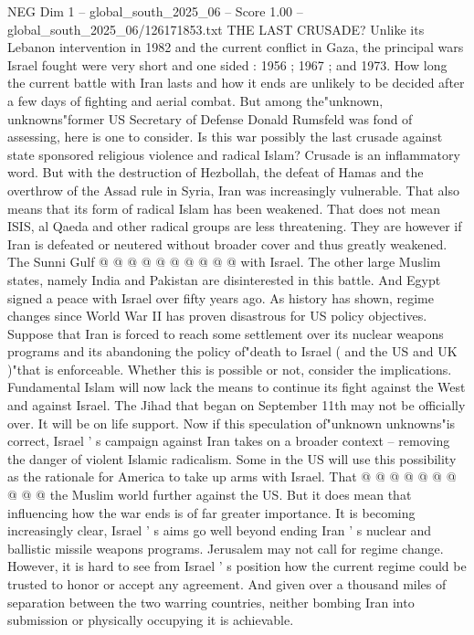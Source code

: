 \begin{textsample}{NEG Dim 1 – global\_south\_2025\_06 – Score 1.00 – global\_south\_2025\_06/126171853.txt}  \label{ex:f1_neg_314}
THE LAST CRUSADE?
Unlike its Lebanon intervention in 1982 and the current conflict in Gaza, the principal wars Israel fought were very short and one sided : 1956 ; 1967 ; and 1973.
How long the current battle with Iran lasts and how it ends are unlikely to be decided after a few days of fighting and aerial combat.
But among the"unknown, unknowns"former US Secretary of Defense Donald Rumsfeld was fond of assessing, here is one to consider.
Is this war possibly the last crusade against state sponsored religious violence and radical Islam?
Crusade is an inflammatory word.
But with the destruction of Hezbollah, the defeat of Hamas and the overthrow of the Assad rule in Syria, Iran was increasingly vulnerable.
That also means that its form of radical Islam has been weakened.
That does not mean ISIS, al Qaeda and other radical groups are less threatening.
They are however if Iran is defeated or neutered without broader cover and thus greatly weakened.
The Sunni Gulf @ @ @ @ @ @ @ @ @ @ with Israel.
The other large Muslim states, namely India and Pakistan are disinterested in this battle.
And Egypt signed a peace with Israel over fifty years ago.
As history has shown, regime changes since World War II has proven disastrous for US policy objectives.
Suppose that Iran is forced to reach some settlement over its nuclear weapons programs and its abandoning the policy of"death to Israel ( and the US and UK )"that is enforceable.
Whether this is possible or not, consider the implications.
Fundamental Islam will now lack the means to continue its fight against the West and against Israel.
The Jihad that began on September 11th may not be officially over.
It will be on life support.
Now if this speculation of"unknown unknowns"is correct, Israel ' s campaign against Iran takes on a broader context -- removing the danger of violent Islamic radicalism.
Some in the US will use this possibility as the rationale for America to take up arms with Israel.
That @ @ @ @ @ @ @ @ @ @ the Muslim world further against the US.
But it does mean that influencing how the war ends is of far greater importance.
It is becoming increasingly clear, Israel ' s aims go well beyond ending Iran ' s nuclear and ballistic missile weapons programs.
Jerusalem may not call for regime change.
However, it is hard to see from Israel ' s position how the current regime could be trusted to honor or accept any agreement.
And given over a thousand miles of separation between the two warring countries, neither bombing Iran into submission or physically occupying it is achievable.

\end{textsample}
